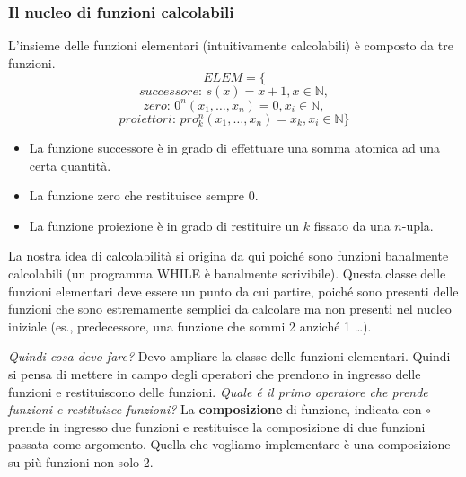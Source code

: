 \documentclass{article}
\begin{document}
\subsubsection{Il nucleo di funzioni calcolabili}
L'insieme delle funzioni elementari (intuitivamente calcolabili) è composto da tre funzioni.
$$ELEM=\{$$
$$\textit{successore: }s(x)=x+1, x\in\mathbb{N},$$
$$\textit{zero: }0^n(x_1,\dots,x_n)=0, x_i\in\mathbb{N},$$
$$\textit{proiettori: }pro_k^n(x_1,\dots,x_n)=x_k,x_i\in\mathbb{N}\}$$

\begin{itemize}
    \item La funzione successore è in grado di effettuare una somma atomica ad una certa quantità.
    \item La funzione zero che restituisce sempre 0.
    \item La funzione proiezione è in grado di restituire un $k$ fissato da una $n$-upla.
\end{itemize}
La nostra idea di calcolabilità si origina da qui poiché sono funzioni
banalmente calcolabili (un programma WHILE è banalmente scrivibile). Questa classe delle funzioni
elementari deve essere un punto da cui partire, poiché sono presenti delle funzioni che
sono estremamente semplici da calcolare ma non presenti nel nucleo iniziale (es., predecessore, una funzione
che sommi 2 anziché 1 \dots).

\textit{Quindi cosa devo fare?} Devo ampliare la classe delle funzioni elementari. Quindi
si pensa di mettere in campo degli operatori che prendono in ingresso delle funzioni e restituiscono
delle funzioni. \textit{Quale é il primo operatore che prende funzioni e restituisce funzioni?}
La \textbf{composizione} di funzione, indicata con $\circ$ prende in ingresso due funzioni e restituisce
la composizione di due funzioni passata come argomento. Quella che vogliamo implementare è una
composizione su più funzioni non solo 2.
\end{document}
